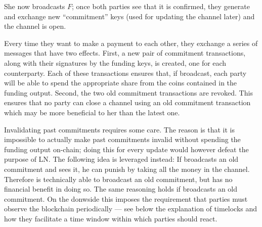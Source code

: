     She now broadcasts $F$; once both parties see that it is confirmed,
    they generate and exchange new ``commitment'' keys (used for
    updating the channel later) and the channel is open.

    Every time they want to make a payment to each other, they exchange a series
    of messages that have two effects. First, a new pair of commitment
    transactions, along with their signatures by the funding keys, is created,
    one for each counterparty. Each of these transactions ensures that, if
    broadcast, each party will be able to spend the appropriate share from the
    coins contained in the funding output. Second, the two old commitment
    transactions are revoked. This ensures that no party can close a channel
    using an old commitment transaction which may be more beneficial to her than
    the latest one.

    Invalidating past commitments requires some care. The reason is that it is
    impossible to actually make past commitments invalid without spending the
    funding output on-chain; doing this for every update would however
    defeat the purpose of LN. The following idea is leveraged instead: If
    \alice{} broadcasts an old commitment and \bob{} sees it, he can punish
    \alice{} by taking all the money in the channel. Therefore \alice{} is
    technically able to broadcast an old commitment, but has no financial
    benefit in doing so. The same reasoning holds if \bob{} broadcasts
    an old commitment. On the donwside this imposes the requirement that
    parties must observe the blockchain periodically --- see below the
    explanation of timelocks and how they facilitate a time window within which
    parties should react.

